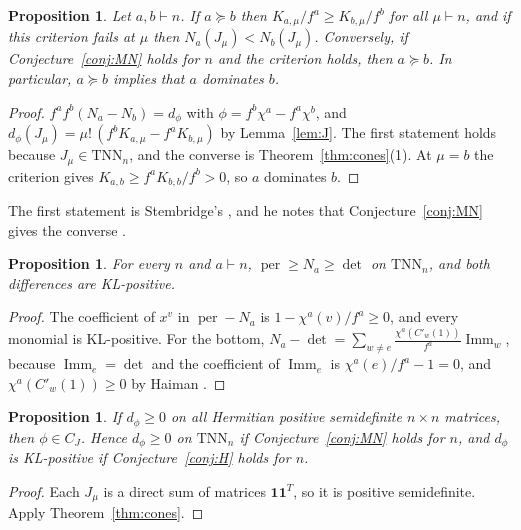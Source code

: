 \documentclass[11pt]{amsart}
\newtheorem{proposition}[theorem]{Proposition}
\theoremstyle{definition}
\theoremstyle{remark}
\newcommand{\Imm}{\operatorname{Imm}}
\newcommand{\TNN}{\mathrm{TNN}}
\newcommand{\per}{\operatorname{per}}
\newcommand{\CJ}{C_{J}}
\newcommand{\Cp}[1]{C'_{#1}(1)}
\begin{document}
\begin{proposition}\label{prop:ordercrit}
Let $a,b\vdash n$. If $a\succeq b$ then $K_{a,\mu}/f^a\ge K_{b,\mu}/f^b$ for all $\mu\vdash n$, and if this criterion fails at $\mu$ then $N_a(J_\mu)<N_b(J_\mu)$. Conversely, if Conjecture~\ref{conj:MN} holds for $n$ and the criterion holds, then $a\succeq b$. In particular, $a\succeq b$ implies that $a$ dominates $b$.
\end{proposition}

\begin{proof}
$f^af^b(N_a-N_b)=d_\phi$ with $\phi=f^b\chi^a-f^a\chi^b$, and $d_\phi(J_\mu)=\mu!\,(f^bK_{a,\mu}-f^aK_{b,\mu})$ by Lemma~\ref{lem:J}. The first statement holds because $J_\mu\in\TNN_n$, and the converse is Theorem~\ref{thm:cones}(1). At $\mu=b$ the criterion gives $K_{a,b}\ge f^aK_{b,b}/f^b>0$, so $a$ dominates $b$.
\end{proof}

The first statement is Stembridge's \cite[Prop.~3.1]{Ste92}, and he notes that Conjecture~\ref{conj:MN} gives the converse \cite[\S3]{Ste92}.

\begin{proposition}\label{prop:topbottom}
For every $n$ and $a\vdash n$, $\per\ge N_a\ge\det$ on $\TNN_n$, and both differences are KL-positive.
\end{proposition}

\begin{proof}
The coefficient of $x^v$ in $\per-N_a$ is $1-\chi^a(v)/f^a\ge0$, and every monomial is KL-positive. For the bottom, $N_a-\det=\sum_{w\ne e}\frac{\chi^a(\Cp w)}{f^a}\Imm_w$, because $\Imm_e=\det$ and the coefficient of $\Imm_e$ is $\chi^a(e)/f^a-1=0$, and $\chi^a(\Cp w)\ge0$ by Haiman \cite[Lemma~1.1]{Hai}.
\end{proof}

\begin{proposition}\label{prop:psd}
If $d_\phi\ge0$ on all Hermitian positive semidefinite $n\times n$ matrices, then $\phi\in\CJ$. Hence $d_\phi\ge0$ on $\TNN_n$ if Conjecture~\ref{conj:MN} holds for $n$, and $d_\phi$ is KL-positive if Conjecture~\ref{conj:H} holds for $n$.
\end{proposition}

\begin{proof}
Each $J_\mu$ is a direct sum of matrices $\mathbf 1\mathbf 1^T$, so it is positive semidefinite. Apply Theorem~\ref{thm:cones}.
\end{proof}
\end{document}

